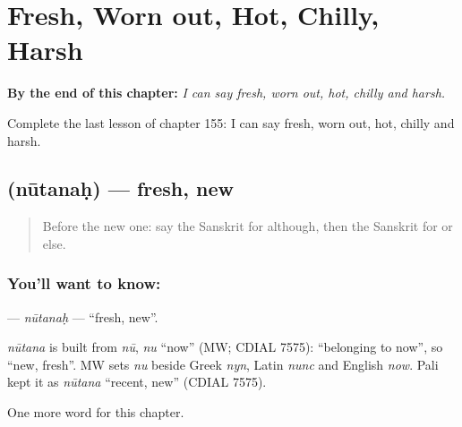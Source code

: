 
\chapter{Fresh, Worn out, Hot, Chilly, Harsh}
\label{ch:sa-fresh-worn-out-hot-chilly-harsh}

\begin{chapteropening}
\textbf{By the end of this chapter:} \emph{I can say fresh, worn out, hot, chilly and harsh.}

Complete the last lesson of chapter 155: I can say fresh, worn out, hot, chilly and harsh.
\end{chapteropening}

\section[\texorpdfstring{\sk{नूतनः} (nūtanaḥ)}{नूतनः (nūtanaḥ)}]{ (nūtanaḥ) — fresh, new}

\label{lesson:SA-C155-nutanah}



\begin{quote}
Before the new one: say the Sanskrit for although, then the Sanskrit for or else.
\end{quote}

\subsection*{You'll want to know: }
\textbf{} — \emph{nūtanaḥ} — \textquotedblleft{}fresh, new\textquotedblright{}.

\begin{cousinweb}
\emph{nūtana} is built from \emph{nū}, \emph{nu} \textquotedblleft{}now\textquotedblright{} (MW; CDIAL 7575): \textquotedblleft{}belonging to now\textquotedblright{}, so \textquotedblleft{}new, fresh\textquotedblright{}. MW sets \emph{nu} beside Greek \emph{nyn}, Latin \emph{nunc} and English \emph{now}. Pali kept it as \emph{nūtana} \textquotedblleft{}recent, new\textquotedblright{} (CDIAL 7575).
\end{cousinweb}

\begin{grammarlens}[title={What you've built}]
One more word for this chapter.
\end{grammarlens}

